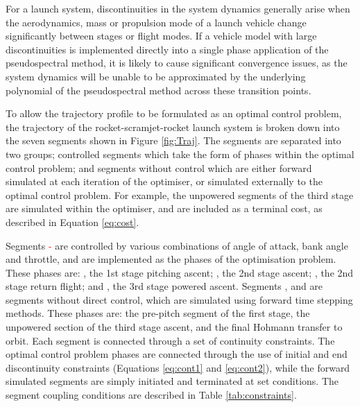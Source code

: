 For a launch system, discontinuities in the system dynamics generally arise when the aerodynamics, mass or propulsion mode of a launch vehicle change significantly between stages or flight modes. 
If a vehicle model with large discontinuities is implemented directly into a single phase application of the pseudospectral method, it is likely to cause significant convergence issues, as the system dynamics will be unable to be approximated by the underlying polynomial of the pseudospectral method across these transition points\cite{Betts2009}.

 
 To allow the trajectory profile to be formulated as an optimal control problem, the trajectory of the rocket-scramjet-rocket launch system is broken down into the seven segments shown in Figure \ref{fig:Traj}. 
  The segments are separated into two groups; controlled segments which take the form of phases within the optimal control problem; and segments without control which are either forward simulated at each iteration of the optimiser, or simulated externally to the optimal control problem. For example, the unpowered segments of the third stage are simulated within the optimiser, and are included as a terminal cost, as described in Equation \ref{eq:cost}. 
  
 Segments \textcolor{red}{-} are controlled by various combinations of angle of attack, bank angle and throttle, and are implemented as the phases of the optimisation problem. These phases are: \textcolor{red}{}, the 1st stage pitching ascent; \textcolor{red}{}, the 2nd stage ascent; \textcolor{red}{}, the 2nd stage return flight; and \textcolor{red}{}, the 3rd stage powered ascent.
 Segments \textcolor{red}{},\textcolor{red}{} and \textcolor{red}{} are segments without direct control, which are simulated using forward time stepping methods. 
 These phases are: the pre-pitch segment of the first stage, the unpowered section of the third stage ascent, and the final Hohmann transfer to orbit. 
 Each segment is connected through a set of continuity constraints. 
  The optimal control problem phases are connected through the use of initial and end discontinuity constraints (Equations \ref{eq:cont1} and \ref{eq:cont2}), while the forward simulated segments are simply initiated and terminated at set conditions. 
 The segment coupling conditions are described in Table \ref{tab:constraints}.


